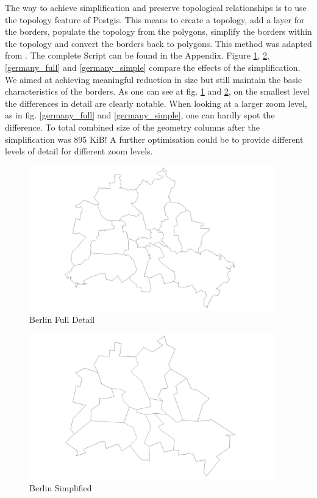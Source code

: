 \documentclass[paper=a4, fontsize=11pt]{article} %
\numberwithin{equation}{section} %
\numberwithin{figure}{section} %
\numberwithin{table}{section} %
\begin{document}
The way to achieve simplification and preserve topological relationships is to use the topology feature of Postgis. This means to create a topology, add a layer for the borders, populate the topology from the polygons, simplify the borders within the topology and convert the borders back to polygons. This method was adapted from \cite{website:strks-blog}. The complete Script can be found in the Appendix. Figure \ref{borders_full}, \ref{borders_simple}, \ref{germany_full} and \ref{germany_simple} compare the effects of the simplification. We aimed at achieving meaningful reduction in size but still maintain the basic characteristics of the borders. As one can see at fig. \ref{borders_full} and \ref{borders_simple}, on the smallest level the differences in detail are clearly notable. When looking at a larger zoom level, as in fig. \ref{germany_full} and \ref{germany_simple}, one can hardly spot the difference. To total combined size of the geometry columns after the simplification was 895 KiB! A further optimisation could be to provide different levels of detail for different zoom levels.

\begin{figure}[htbp]
	\centering
	\includegraphics[trim = 0mm 0mm 0mm 0mm, clip, width=0.95\textwidth]{pictures/berlin_full}
	\caption{Berlin Full Detail}
	\label{borders_full}
\end{figure}

\begin{figure}[htbp]
	\centering
	\includegraphics[trim = 0mm 0mm 0mm 0mm, clip, width=0.95\textwidth]{pictures/berlin_simplified}
	\caption{Berlin Simplified}
	\label{borders_simple}
\end{figure}
\end{document}
